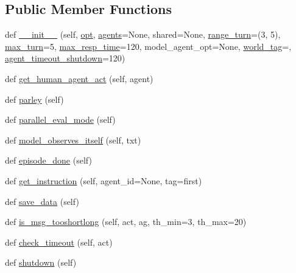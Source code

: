 \subsection*{Public Member Functions}
\begin{DoxyCompactItemize}
\item 
def \hyperlink{classmturk__evaluation__task_1_1worlds_1_1WizardEval_a1ec4e39e799dad1ac1ac7a0720cd7423}{\+\_\+\+\_\+init\+\_\+\+\_\+} (self, \hyperlink{classparlai_1_1core_1_1worlds_1_1World_a3640d92718acd3e6942a28c1ab3678bd}{opt}, \hyperlink{classparlai_1_1core_1_1worlds_1_1MultiAgentDialogWorld_a05fc93525cb86edef121980fc55f9926}{agents}=None, shared=None, \hyperlink{classmturk__evaluation__task_1_1worlds_1_1WizardEval_a9cf6dee77a84e372db1c88e27ecb3dea}{range\+\_\+turn}=(3, 5), \hyperlink{classmturk__evaluation__task_1_1worlds_1_1WizardEval_ae2fb288f7903cb6694bfc070a6f4f66a}{max\+\_\+turn}=5, \hyperlink{classmturk__evaluation__task_1_1worlds_1_1WizardEval_af9489d5ec7d0b139d406bf764c90370d}{max\+\_\+resp\+\_\+time}=120, model\+\_\+agent\+\_\+opt=None, \hyperlink{classmturk__evaluation__task_1_1worlds_1_1WizardEval_a159f57b257cf77486953e1bb98639b72}{world\+\_\+tag}=\textquotesingle{}\textquotesingle{}, \hyperlink{classmturk__evaluation__task_1_1worlds_1_1WizardEval_a0bc0625ef18126cc55b4ad11b7585016}{agent\+\_\+timeout\+\_\+shutdown}=120)
\item 
def \hyperlink{classmturk__evaluation__task_1_1worlds_1_1WizardEval_a8d951acf0577bb2cfbfe77f49c9147da}{get\+\_\+human\+\_\+agent\+\_\+act} (self, agent)
\item 
def \hyperlink{classmturk__evaluation__task_1_1worlds_1_1WizardEval_a8c2713a39b3a8e89bec417c2b6c0c1eb}{parley} (self)
\item 
def \hyperlink{classmturk__evaluation__task_1_1worlds_1_1WizardEval_a63d88c9aa26eb8886eb2928d920017cb}{parallel\+\_\+eval\+\_\+mode} (self)
\item 
def \hyperlink{classmturk__evaluation__task_1_1worlds_1_1WizardEval_a42afcd4c9f3d9f3847bee129cec1d150}{model\+\_\+observes\+\_\+itself} (self, txt)
\item 
def \hyperlink{classmturk__evaluation__task_1_1worlds_1_1WizardEval_a99651f189139f9b7d2cd63375b6328b5}{episode\+\_\+done} (self)
\item 
def \hyperlink{classmturk__evaluation__task_1_1worlds_1_1WizardEval_aca4ed4e6a2e6aefb9f7cf9964b325212}{get\+\_\+instruction} (self, agent\+\_\+id=None, tag=\textquotesingle{}first\textquotesingle{})
\item 
def \hyperlink{classmturk__evaluation__task_1_1worlds_1_1WizardEval_a44b1c6ee341d73d7d749cb940edec47b}{save\+\_\+data} (self)
\item 
def \hyperlink{classmturk__evaluation__task_1_1worlds_1_1WizardEval_ad30c9575f816b5905836d78d35ac135e}{is\+\_\+msg\+\_\+tooshortlong} (self, act, ag, th\+\_\+min=3, th\+\_\+max=20)
\item 
def \hyperlink{classmturk__evaluation__task_1_1worlds_1_1WizardEval_aa7477247b6a732f69d461fca5c02945a}{check\+\_\+timeout} (self, act)
\item 
def \hyperlink{classmturk__evaluation__task_1_1worlds_1_1WizardEval_a1a5817fdfd4716e770ad6a5c8a2c33dc}{shutdown} (self)
\end{DoxyCompactItemize}
